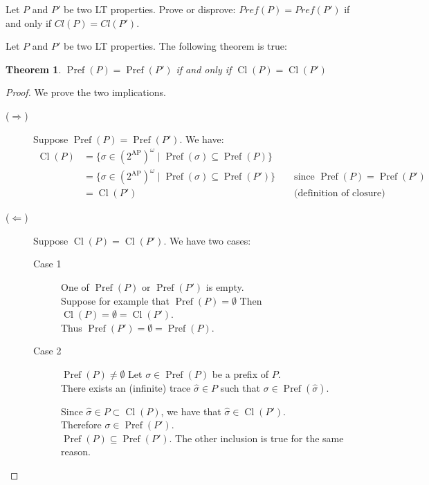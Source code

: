 \documentclass[11pt,a4paper]{article}
\newtheorem*{theorem}{Theorem}
\DeclareMathOperator{\Pref}{Pref}
\DeclareMathOperator{\Cl}{Cl}
\begin{document}
\begin{Exercise}

Let $P$ and $P'$ be two LT properties. Prove or disprove: $Pref(P) = Pref(P')$ if and only if $Cl(P) = Cl(P')$.
\end{Exercise}

\begin{Answer}

  Let $P$ and $P'$ be two LT properties. The following theorem is true:
  \begin{theorem}
    $\Pref(P) = \Pref(P')$ if and only if $\Cl(P) = \Cl(P')$
  \end{theorem}
  \begin{proof}
    We prove the two implications.
    \begin{description}
      \item[($\Rightarrow$)]
        Suppose $\Pref(P) = \Pref(P')$. We have:
        \begin{align*}
          \Cl(P) &= \{\sigma\in{(2^{\textrm{AP}})}^\omega \mid \Pref(\sigma)\subseteq\Pref(P)\}\\
          &= \{\sigma\in{(2^{\textrm{AP}})}^\omega \mid \Pref(\sigma)\subseteq\Pref(P')\} &&\text{ since }\Pref(P) = \Pref(P')\\
          &= \Cl(P')&&\text{ (definition of closure)}
        \end{align*}
      \item[($\Leftarrow$)]
        Suppose $\Cl(P) = \Cl(P')$. We have two cases:
        \begin{description}
          \item[Case 1] One of $\Pref(P)$ or $\Pref(P')$ is empty.\\
          Suppose for example that $\Pref(P) = \emptyset$ Then $\Cl(P) = \emptyset = \Cl(P')$.\\
          Thus $\Pref(P') = \emptyset = \Pref(P)$.
          \item[Case 2] $\Pref(P) \neq \emptyset$
          Let $\sigma\in\Pref(P)$ be a prefix of $P$. \\
          There exists an (infinite) trace $\hat{\sigma} \in P$ such that $\sigma\in\Pref(\hat{\sigma})$.

          Since $\hat{\sigma}\in P\subset\Cl(P)$, we have that $\hat{\sigma}\in\Cl(P')$. \\
          Therefore $\sigma\in\Pref(P')$.\\
          $\Pref(P)\subseteq\Pref(P')$. The other inclusion is true for the same reason.

        \end{description}
    \end{description}
  \end{proof}
\end{Answer}
\end{document}
